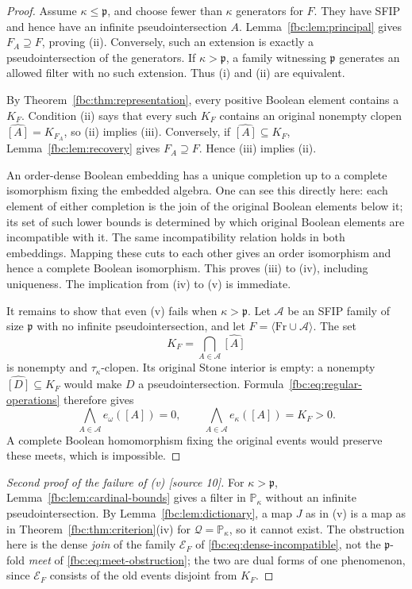 \documentclass[11pt,letterpaper]{article}
\theoremstyle{definition}
\theoremstyle{remark}
\newcommand{\om}{\omega}
\newcommand{\Fr}{\mathrm{Fr}}
\newcommand{\PP}{\mathbb P}
\newcommand{\cp}{\mathfrak p}
\newcommand{\gen}[1]{\langle #1\rangle}
\newcommand{\cE}{\mathcal E}
\newcommand{\cQ}{\mathcal Q}
\newcommand{\src}[1]{\textup{[#1]}}
\begin{document}
\begin{proof}
Assume $\kappa\leq\cp$, and choose fewer than $\kappa$ generators
for $F$. They have SFIP and hence have an infinite pseudointersection
$A$. Lemma~\ref{fbc:lem:principal} gives $F_A\supseteq F$, proving
\textup{(ii)}. Conversely, such an extension is exactly a
pseudointersection of the generators. If $\kappa>\cp$, a family
witnessing $\cp$ generates an allowed filter with no such extension.
Thus \textup{(i)} and \textup{(ii)} are equivalent.

By Theorem~\ref{fbc:thm:representation}, every positive Boolean element
contains a $K_F$. Condition \textup{(ii)} says that every such $K_F$
contains an original nonempty clopen $\widehat{[A]}=K_{F_A}$, so
\textup{(ii)} implies \textup{(iii)}. Conversely, if
$\widehat{[A]}\subseteq K_F$, Lemma~\ref{fbc:lem:recovery} gives
$F_A\supseteq F$. Hence \textup{(iii)} implies \textup{(ii)}.

An order-dense Boolean embedding has a unique completion up to a
complete isomorphism fixing the embedded algebra. One can see this
directly here: each element of either completion is the join of the
original Boolean elements below it; its set of such lower bounds
is determined by which original Boolean elements are incompatible
with it. The same incompatibility relation holds in both embeddings.
Mapping these cuts to each other gives an order isomorphism and hence
a complete Boolean isomorphism. This proves \textup{(iii)} to
\textup{(iv)}, including uniqueness. The implication from
\textup{(iv)} to \textup{(v)} is immediate.

It remains to show that even \textup{(v)} fails when $\kappa>\cp$.
Let $\mathcal A$ be an SFIP family of size $\cp$ with no infinite
pseudointersection, and let $F=\gen{\Fr\cup\mathcal A}$. The set
\[
 K_F=\bigcap_{A\in\mathcal A}\widehat{[A]}
\]
is nonempty and $\tau_\kappa$-clopen. Its original Stone interior is
empty: a nonempty $\widehat{[D]}\subseteq K_F$ would make $D$ a
pseudointersection. Formula~\eqref{fbc:eq:regular-operations} therefore
gives
\begin{equation}\label{fbc:eq:meet-obstruction}
 \bigwedge_{A\in\mathcal A}e_\om([A])=0,
 \qquad
 \bigwedge_{A\in\mathcal A}e_\kappa([A])=K_F>0.
\end{equation}
A complete Boolean homomorphism fixing the original events would
preserve these meets, which is impossible.
\end{proof}

\begin{proof}[Second proof of the failure of \textup{(v)} \src{source 10}]
For $\kappa>\cp$, Lemma~\ref{fbc:lem:cardinal-bounds} gives a filter in
$\PP_\kappa$ without an infinite pseudointersection. By
Lemma~\ref{fbc:lem:dictionary}, a map $J$ as in \textup{(v)} is a map as
in Theorem~\ref{fbc:thm:criterion}\textup{(iv)} for $\cQ=\PP_\kappa$, so
it cannot exist. The obstruction here is the dense \emph{join} of the
family $\cE_F$ of \eqref{fbc:eq:dense-incompatible}, not the $\cp$-fold
\emph{meet} of \eqref{fbc:eq:meet-obstruction}; the two are dual forms of
one phenomenon, since $\cE_F$ consists of the old events disjoint from
$K_F$.
\end{proof}
\end{document}
